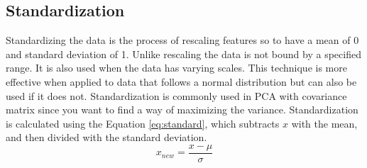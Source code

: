 \subsection{Standardization}\label{ssec:standardization}
Standardizing the data is the process of rescaling features so to have a mean of 0 and standard deviation of 1. Unlike rescaling the data is not bound by a specified range. It is also used when the data has varying scales. This technique is more effective when applied to data that follows a normal distribution but can also be used if it does not. Standardization is commonly used in PCA with covariance matrix since you want to find a way of maximizing the variance. Standardization is calculated using the Equation \eqref{eq:standard}, which subtracts $x$ with the mean, and then divided with the standard deviation. 
\begin{equation} \label{eq:standard}
    x_{new} = \frac{x - \mu}{\sigma}
\end{equation}